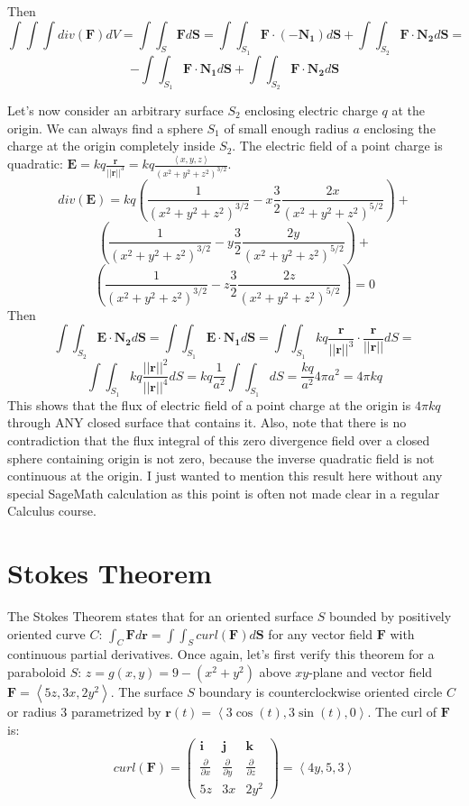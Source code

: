 Then
$$\int\int\int div(\mathbf{F}) dV = \int\int_S \mathbf{F}d\mathbf{S} =\int\int_{S_1} \mathbf{F} \cdot (-\mathbf{N_1})d\mathbf{S} + \int\int_{S_2} \mathbf{F} \cdot \mathbf{N_2} d\mathbf{S}=$$
$$-\int\int_{S_1} \mathbf{F} \cdot \mathbf{N_1}d\mathbf{S} +\int\int_{S_2} \mathbf{F} \cdot \mathbf{N_2} d\mathbf{S}$$

Let's now consider an arbitrary surface $S_2$ enclosing electric charge $q$ at the origin.  We can always find a sphere $S_1$ of small enough radius $a$ enclosing the charge at the origin completely inside $S_2$.  The electric field of a point charge is quadratic: $\mathbf{E} = kq\frac{\mathbf{r}}{||\mathbf{r}||^3}=kq \frac{\left< x,y,z \right>}{(x^2+y^2+z^2)^{3/2}}$.
$$div(\mathbf{E} ) = kq\left(  \frac{1}{(x^2+y^2+z^2)^{3/2}} -x \frac{3}{2} \frac{2x}{(x^2+y^2+z^2)^{5/2}}  \right) +$$
$$\left( \frac{1}{(x^2+y^2+z^2)^{3/2}} -y \frac{3}{2} \frac{2y}{(x^2+y^2+z^2)^{5/2}}  \right) + $$
$$\left( \frac{1}{(x^2+y^2+z^2)^{3/2}} - z \frac{3}{2} \frac{2z}{(x^2+y^2+z^2)^{5/2}}   \right) = 0$$
Then
$$\int\int_{S_2} \mathbf{E} \cdot \mathbf{N_2} d\mathbf{S} = \int\int_{S_1} \mathbf{E} \cdot \mathbf{N_1} d\mathbf{S} = 
\int\int_{S_1}   kq\frac{\mathbf{r}}{||\mathbf{r}||^3} \cdot \frac{\mathbf{r}}{||\mathbf{r}||} dS = $$
$$ \int\int_{S_1}   kq\frac{||\mathbf{r}||^2}{||\mathbf{r}||^4} dS = kq\frac{1}{a^2} \int\int_{S_1}    dS = \frac{kq}{a^2}4\pi a^2 = 4\pi k q$$This shows that the flux of electric field of a point charge at the origin is $4\pi k q$ through ANY closed surface that contains it.   Also, note that there is no contradiction that the flux integral of this zero divergence field over a closed sphere containing origin is not zero, because the inverse quadratic field is not continuous at the origin.   I just wanted to mention this result here without any special SageMath calculation as this point is often not made clear in a regular Calculus course.







\section{Stokes Theorem}

The Stokes Theorem states that for an oriented surface $S$ bounded by positively oriented curve $C$:  $\int_C \mathbf{F}d\mathbf{r} = \int\int_S curl( \mathbf{F})d\mathbf{S}$ for any vector field $ \mathbf{F}$ with continuous partial derivatives.   Once again, let's first verify this theorem for a paraboloid $S$: $z=g(x,y)=9-(x^2+y^2)$ above $ xy$-plane and vector field $\mathbf{F} = \left< 5z,3x,2y^2 \right>$.    The surface $S$ boundary is counterclockwise oriented circle $C$ or radius 3 parametrized by $\mathbf{r}(t) = \left< 3\cos(t),3\sin(t),0 \right>$.   The curl of $\mathbf{F}$ is:
$$curl(\mathbf{F}) = \begin{pmatrix}
\mathbf{i}& \mathbf{j} & \mathbf{k}\\
\frac{\partial}{\partial x} & \frac{\partial}{\partial y} & \frac{\partial}{\partial z} \\
5z &   3x &  2y^2
\end{pmatrix} = \left<4y, 5,3 \right> $$

